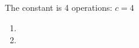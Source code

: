 \documentclass[12pt]{article}
\begin{document}
\subsection{} %
The constant is 4 operations: $c = 4$

\begin{enumerate}[a]
	\item %
	\item %
\end{enumerate}

\subsection{} %

\subsection{} %

\subsection{} %
\end{document}
